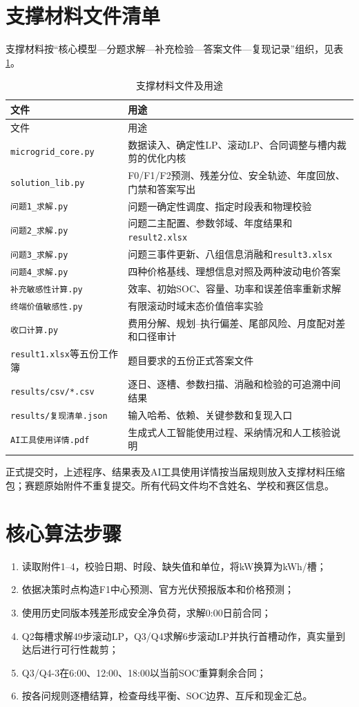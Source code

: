 \documentclass[UTF8,12pt,a4paper]{ctexart}
\theoremstyle{remark}
\begin{document}
\section{支撑材料文件清单}
支撑材料按“核心模型—分题求解—补充检验—答案文件—复现记录”组织，见表\ref{tab:support-files}。
\begin{longtable}{p{}p{}}
\caption{支撑材料文件及用途}\label{tab:support-files}\\
\toprule 文件&用途\\\midrule\endfirsthead
\toprule 文件&用途\\\midrule\endhead
\texttt{microgrid\_core.py}&数据读入、确定性LP、滚动LP、合同调整与槽内裁剪的优化内核\\
\texttt{solution\_lib.py}&F0/F1/F2预测、残差分位、安全轨迹、年度回放、门禁和答案写出\\
\texttt{问题1\_求解.py}&问题一确定性调度、指定时段表和物理校验\\
\texttt{问题2\_求解.py}&问题二主配置、参数邻域、年度结果和\texttt{result2.xlsx}\\
\texttt{问题3\_求解.py}&问题三事件更新、八组信息消融和\texttt{result3.xlsx}\\
\texttt{问题4\_求解.py}&四种价格基线、理想信息对照及两种波动电价答案\\
\texttt{补充敏感性计算.py}&效率、初始SOC、容量、功率和误差倍率重新求解\\
\texttt{终端价值敏感性.py}&有限滚动时域末态价值倍率实验\\
\texttt{收口计算.py}&费用分解、规划--执行偏差、尾部风险、月度配对差和口径审计\\
\texttt{result1.xlsx}等五份工作簿&题目要求的五份正式答案文件\\
\texttt{results/csv/*.csv}&逐日、逐槽、参数扫描、消融和检验的可追溯中间结果\\
\texttt{results/复现清单.json}&输入哈希、依赖、关键参数和复现入口\\
\texttt{AI工具使用详情.pdf}&生成式人工智能使用过程、采纳情况和人工核验说明\\\bottomrule
\end{longtable}

正式提交时，上述程序、结果表及AI工具使用详情按当届规则放入支撑材料压缩包；赛题原始附件不重复提交。所有代码文件均不含姓名、学校和赛区信息。

\section{核心算法步骤}
\begin{enumerate}
\item 读取附件1--4，校验日期、时段、缺失值和单位，将kW换算为kWh/槽；
\item 依据决策时点构造F1中心预测、官方光伏预报版本和价格预测；
\item 使用历史同版本残差形成安全净负荷，求解0:00日前合同；
\item Q2每槽求解49步滚动LP，Q3/Q4求解6步滚动LP并执行首槽动作，真实量到达后进行可行性裁剪；
\item Q3/Q4-3在6:00、12:00、18:00以当前SOC重算剩余合同；
\item 按各问规则逐槽结算，检查母线平衡、SOC边界、互斥和现金汇总。
\end{enumerate}
\end{document}
